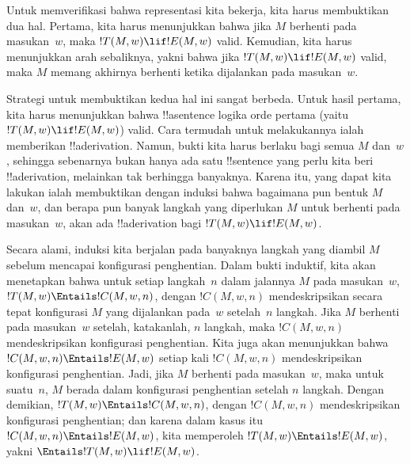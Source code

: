 \documentclass[../../../include/open-logic-section]{subfiles}
\begin{document}

\begin{explain}
Untuk memverifikasi bahwa representasi kita bekerja, kita harus membuktikan
dua hal. Pertama, kita harus menunjukkan bahwa jika $M$ berhenti pada
masukan~$w$, maka $!T(M, w) \lif !E(M, w)$ valid. Kemudian, kita harus
menunjukkan arah sebaliknya, yakni bahwa jika $!T(M, w) \lif !E(M, w)$ valid,
maka $M$ memang akhirnya berhenti ketika dijalankan pada masukan~$w$.

Strategi untuk membuktikan kedua hal ini sangat berbeda. Untuk hasil pertama,
kita harus menunjukkan bahwa !!a{sentence} logika orde pertama (yaitu
$!T(M, w) \lif !E(M, w)$) valid. Cara termudah untuk melakukannya ialah
memberikan !!a{derivation}. Namun, bukti kita harus berlaku bagi semua $M$
dan~$w$, sehingga sebenarnya bukan hanya ada satu !!{sentence} yang perlu kita
beri !!a{derivation}, melainkan tak berhingga banyaknya. Karena itu, yang dapat
kita lakukan ialah membuktikan dengan induksi bahwa bagaimana pun bentuk $M$
dan~$w$, dan berapa pun banyak langkah yang diperlukan $M$ untuk berhenti pada
masukan~$w$, akan ada !!a{derivation} bagi $!T(M, w) \lif !E(M, w)$.

Secara alami, induksi kita berjalan pada banyaknya langkah yang diambil $M$
sebelum mencapai konfigurasi penghentian. Dalam bukti induktif, kita akan
menetapkan bahwa untuk setiap langkah~$n$ dalam jalannya $M$ pada masukan~$w$,
$!T(M, w) \Entails !C(M, w, n)$, dengan $!C(M, w, n)$ mendeskripsikan secara
tepat konfigurasi $M$ yang dijalankan pada~$w$ setelah~$n$ langkah. Jika $M$
berhenti pada masukan~$w$ setelah, katakanlah, $n$ langkah, maka $!C(M, w, n)$
mendeskripsikan konfigurasi penghentian. Kita juga akan menunjukkan bahwa
$!C(M, w, n) \Entails !E(M, w)$ setiap kali $!C(M, w, n)$ mendeskripsikan
konfigurasi penghentian. Jadi, jika $M$ berhenti pada masukan~$w$, maka untuk
suatu~$n$, $M$ berada dalam konfigurasi penghentian setelah $n$ langkah.
Dengan demikian, $!T(M, w) \Entails !C(M, w, n)$, dengan $!C(M, w, n)$
mendeskripsikan konfigurasi penghentian; dan karena dalam kasus itu
$!C(M, w, n) \Entails !E(M, w)$, kita memperoleh
$!T(M, w) \Entails !E(M, w)$, yakni $\Entails !T(M, w) \lif !E(M, w)$.


\end{explain}
\end{document}
